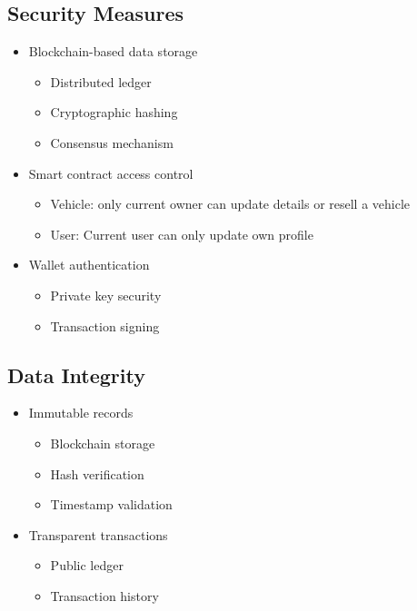 \documentclass[12pt,a4paper]{article}
\begin{document}
    \subsection{Security Measures}
    \begin{itemize}
        \item Blockchain-based data storage
        \begin{itemize}
            \item Distributed ledger
            \item Cryptographic hashing
            \item Consensus mechanism
        \end{itemize}

        \item Smart contract access control
        \begin{itemize}
            \item Vehicle: only current owner can update details or resell a vehicle
            \item User: Current user can only update own profile
        \end{itemize}

        \item Wallet authentication
        \begin{itemize}
            \item Private key security
            \item Transaction signing
        \end{itemize}
    \end{itemize}

    \subsection{Data Integrity}
    \begin{itemize}
        \item Immutable records
        \begin{itemize}
            \item Blockchain storage
            \item Hash verification
            \item Timestamp validation
        \end{itemize}

        \item Transparent transactions
        \begin{itemize}
            \item Public ledger
            \item Transaction history
        \end{itemize}
    \end{itemize}
\end{document}
